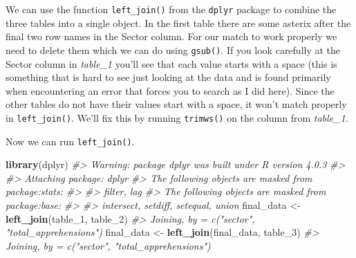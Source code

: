 \documentclass[
  12pt,
]{book}
\newenvironment{Shaded}{\begin{snugshade}}{\end{snugshade}}
\newcommand{\CharTok}[1]{\textcolor[rgb]{0.5,0.5,0.5}{#1}}
\newcommand{\CommentTok}[1]{\textcolor[rgb]{0.37,0.37,0.37}{\textit{#1}}}
\newcommand{\DecValTok}[1]{\textcolor[rgb]{0.06,0.06,0.06}{#1}}
\newcommand{\KeywordTok}[1]{\textcolor[rgb]{0.27,0.27,0.27}{\textbf{#1}}}
\newcommand{\NormalTok}[1]{#1}
\newcommand{\OperatorTok}[1]{\textcolor[rgb]{0.43,0.43,0.43}{\textbf{#1}}}
\newcommand{\StringTok}[1]{\textcolor[rgb]{0.5,0.5,0.5}{#1}}
\begin{document}
We can use the function \texttt{left\_join()} from the \texttt{dplyr} package to combine the three tables into a single object. In the first table there are some asterix after the final two row names in the Sector column. For our match to work properly we need to delete them which we can do using \texttt{gsub()}. If you look carefully at the Sector column in \emph{table\_1} you'll see that each value starts with a space (this is something that is hard to see just looking at the data and is found primarily when encountering an error that forces you to search as I did here). Since the other tables do not have their values start with a space, it won't match properly in \texttt{left\_join()}. We'll fix this by running \texttt{trimws()} on the column from \emph{table\_1}.

\begin{Shaded}
\end{Shaded}

Now we can run \texttt{left\_join()}.

\begin{Shaded}
\begin{Highlighting}[]
\KeywordTok{library}\NormalTok{(dplyr)}
\CommentTok{\#\textgreater{} Warning: package \textquotesingle{}dplyr\textquotesingle{} was built under R version 4.0.3}
\CommentTok{\#\textgreater{} }
\CommentTok{\#\textgreater{} Attaching package: \textquotesingle{}dplyr\textquotesingle{}}
\CommentTok{\#\textgreater{} The following objects are masked from \textquotesingle{}package:stats\textquotesingle{}:}
\CommentTok{\#\textgreater{} }
\CommentTok{\#\textgreater{}     filter, lag}
\CommentTok{\#\textgreater{} The following objects are masked from \textquotesingle{}package:base\textquotesingle{}:}
\CommentTok{\#\textgreater{} }
\CommentTok{\#\textgreater{}     intersect, setdiff, setequal, union}
\NormalTok{final\_data \textless{}{-}}\StringTok{ }\KeywordTok{left\_join}\NormalTok{(table\_}\DecValTok{1}\NormalTok{, table\_}\DecValTok{2}\NormalTok{)}
\CommentTok{\#\textgreater{} Joining, by = c("sector", "total\_apprehensions")}
\NormalTok{final\_data \textless{}{-}}\StringTok{ }\KeywordTok{left\_join}\NormalTok{(final\_data, table\_}\DecValTok{3}\NormalTok{)}
\CommentTok{\#\textgreater{} Joining, by = c("sector", "total\_apprehensions")}
\end{Highlighting}
\end{Shaded}
\end{document}
